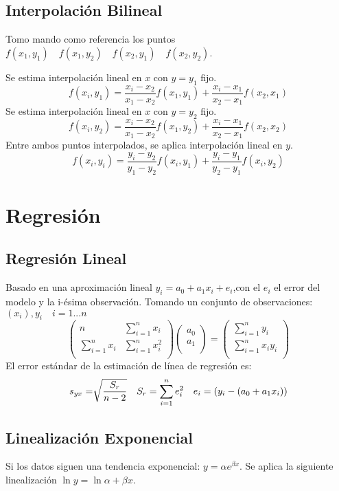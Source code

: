  \subsection{Interpolación Bilineal} Tomo mando como referencia los  puntos $ f(x_1,y_1)\quad f(x_1,y_2) \quad f(x_2,y_1) \quad f(x_2, y_2)$.
 
 Se estima interpolación lineal en $x$ con $y = y_1$ fijo.
 $$ f(x_i,y_1) = \frac{x_i -x_2}{x_1 - x_2}f(x_1,y_1) + \frac{x_i -x_1}{x_2 -x_1}f(x_2,x_1)$$
 Se estima interpolación lineal en $x$ con $y = y_2$ fijo.
 $$ f(x_i,y_2) = \frac{x_i -x_2}{x_1 - x_2}f(x_1,y_2) + \frac{x_i -x_1}{x_2 -x_1}f(x_2,x_2)$$
 Entre ambos puntos interpolados, se aplica interpolación lineal en $y$.
  $$ f(x_i,y_i) = \frac{y_i -y_2}{y_1 - y_2}f(x_i,y_1) + \frac{y_i -y_1}{y_2 -y_1}f(x_i,y_2)$$
  \section{Regresión}
  \subsection{Regresión Lineal} Basado en una aproximación lineal $y_i = a_0 + a_1x_i + e_i$,con el $e_i$ el error del modelo y la i-ésima observación. Tomando un conjunto de observaciones: $(x_i),y_i \quad i = 1 ... n$ 
  	$$
    \left( 
    	\begin{array}{cc}
 		n & \sum_{i=1}^n x_i \\ 
 		\sum_{i=1}^n x_i & \sum_{i=1}^n x_i^2 \\
		\end{array} 
    \right) 
    \left( 
    	\begin{array}{c}
 		 a_0\\ 
 		 a_1\\
		\end{array} 
    \right) =
     \left( 
    	\begin{array}{c}
 		 \sum_{i=1}^n y_i\\ 
 		 \sum_{i=1}^n x_iy_i\\
		\end{array} 
    \right)
  $$ El error estándar de la estimación de línea de regresión es: 
  $$ s_{y\/x} = \sqrt[]{\frac{S_r}{n-2}} \quad S_r = \sum_{i=1}^{n}e_i^2 \quad e_i = (y_i - ( a_0 + a_1x_i)) $$
  
  \subsection{Linealización Exponencial}
  Si los  datos siguen una tendencia exponencial: $y = \alpha  e^{\beta x}$.
  Se aplica la siguiente linealización $\ln{y} = \ln{\alpha} + \beta x$.
